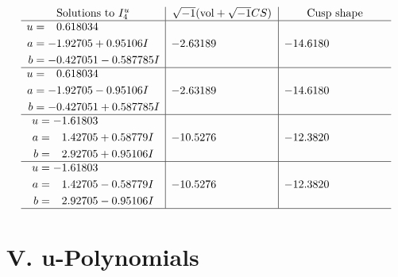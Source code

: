 \documentclass[1p]{elsarticle_modified}
\theoremstyle{definition}
\newcommand{\I}{\sqrt{-1}}
\begin{document}
$$\begin{array}{c|c|c}  
\text{Solutions to }I^u_{4}& \I (\text{vol} + \sqrt{-1}CS) & \text{Cusp shape}\\
 \hline 
\begin{aligned}
u &= \phantom{-}0.618034\phantom{ +0.000000I} \\
a &= -1.92705 + 0.95106 I \\
b &= -0.427051 - 0.587785 I\end{aligned}
 & -2.63189\phantom{ +0.000000I} & -14.6180\phantom{ +0.000000I} \\ \hline\begin{aligned}
u &= \phantom{-}0.618034\phantom{ +0.000000I} \\
a &= -1.92705 - 0.95106 I \\
b &= -0.427051 + 0.587785 I\end{aligned}
 & -2.63189\phantom{ +0.000000I} & -14.6180\phantom{ +0.000000I} \\ \hline\begin{aligned}
u &= -1.61803\phantom{ +0.000000I} \\
a &= \phantom{-}1.42705 + 0.58779 I \\
b &= \phantom{-}2.92705 + 0.95106 I\end{aligned}
 & -10.5276\phantom{ +0.000000I} & -12.3820\phantom{ +0.000000I} \\ \hline\begin{aligned}
u &= -1.61803\phantom{ +0.000000I} \\
a &= \phantom{-}1.42705 - 0.58779 I \\
b &= \phantom{-}2.92705 - 0.95106 I\end{aligned}
 & -10.5276\phantom{ +0.000000I} & -12.3820\phantom{ +0.000000I}\\
 \hline 
 \end{array}$$\newpage
\newpage\renewcommand{\arraystretch}{1}
\centering \section*{ V. u-Polynomials}
\end{document}
